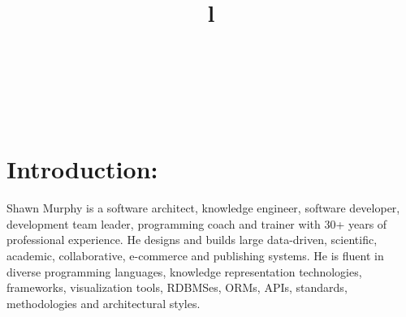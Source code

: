 \documentclass[line,margin,hidelinks]{res}
\begin{document}
 \address{\url{http://smurp.com}\\ Saltspring \& Berlin\\
   \href{https://www.linkedin.com/in/smurp}{linkedin.com/in/smurp}\\
   \href{callto:+1-650-503-4034}{+1-650-503-4034}\\
   {\tt \href{mailto:smurp@smurp.com}{smurp@smurp.com}}}

\resumewidth=7in
\begin{resume}

\begin{format}
\title{l}\\
\\
\body\\
\end{format}


\section{Introduction:}
\begin{par}

Shawn Murphy is a software architect, knowledge engineer,
software developer, development team leader, programming coach
and trainer with 30+ years of professional experience.
He designs and builds large data-driven, scientific, academic,
collaborative, e-commerce and publishing systems.
He is fluent in diverse programming languages, knowledge
representation technologies, frameworks, visualization tools, RDBMSes,
ORMs, APIs, standards, methodologies and architectural styles.

\begin{comment}
Examples of his work include:
  a vehicle fleet tracking system with RESTful API;
  multiple dynamic knowledge visualization systems;
  a custom database publishing system used by the largest real estate
    markets in Western Canada;
  real-estate systems powered by his own RETS implementation;
  a large bibliographic collaboration system seeded with Library of Congress data;
  a Laboratory Information Management System for disease diagnosis which
    captured, processed and reported on disparate scientific data streams;
  recruiting management systems;
  numerous B2B and B2C e-commerce technologies and systems
    (handling both digital and tangible goods);
  and many other projects involving sophisticated data-sets and processing.
\end{comment}


\end{par}
\end{resume}
\end{document}
